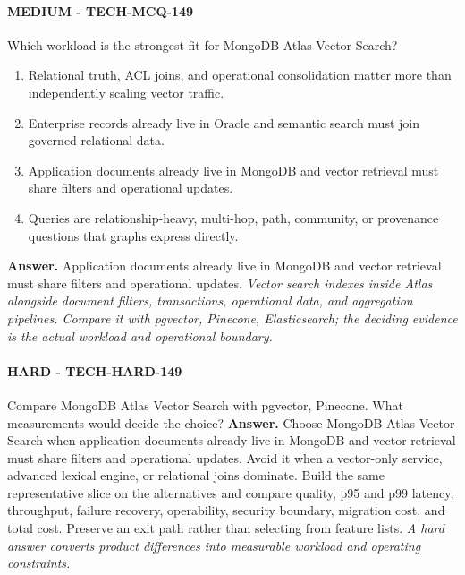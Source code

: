 \paragraph{MEDIUM - TECH-MCQ-149} Which workload is the strongest fit for MongoDB Atlas Vector Search?
\begin{enumerate}[label=\Alph*.]
\item Relational truth, ACL joins, and operational consolidation matter more than independently scaling vector traffic.
\item Enterprise records already live in Oracle and semantic search must join governed relational data.
\item Application documents already live in MongoDB and vector retrieval must share filters and operational updates.
\item Queries are relationship-heavy, multi-hop, path, community, or provenance questions that graphs express directly.
\end{enumerate}
\textbf{Answer.} Application documents already live in MongoDB and vector retrieval must share filters and operational updates.
\textit{Vector search indexes inside Atlas alongside document filters, transactions, operational data, and aggregation pipelines. Compare it with pgvector, Pinecone, Elasticsearch; the deciding evidence is the actual workload and operational boundary.}
\paragraph{HARD - TECH-HARD-149} Compare MongoDB Atlas Vector Search with pgvector, Pinecone. What measurements would decide the choice?
\textbf{Answer.} Choose MongoDB Atlas Vector Search when application documents already live in MongoDB and vector retrieval must share filters and operational updates. Avoid it when a vector-only service, advanced lexical engine, or relational joins dominate. Build the same representative slice on the alternatives and compare quality, p95 and p99 latency, throughput, failure recovery, operability, security boundary, migration cost, and total cost. Preserve an exit path rather than selecting from feature lists.
\textit{A hard answer converts product differences into measurable workload and operating constraints.}
